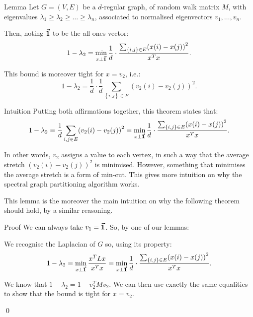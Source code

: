 \documentclass[a4paper]{article}
\begin{document}
\begin{parag}{Lemma}
    Let $G = \left(V, E\right)$ be a $d$-regular graph, of random walk matrix $M$, with eigenvalues $\lambda_1 \geq \lambda_2 \geq \ldots \geq \lambda_n$, associated to normalised eigenvectors $v_1, \ldots, v_n$.

    Then, noting $\bm{\protect\vec{1}}$ to be the all ones vector: 
    \[1 - \lambda_2 = \min_{x \perp \bvec{1}} \dfrac{1}{d}\cdot \dfrac{\sum_{\left\{i, j\right\} \in E} \left(x\left(i\right) - x\left(j\right)\right)^2}{x^T x}.\]

    This bound is moreover tight for $x = v_2$, i.e.:
    \[1 - \lambda_2 = \frac{1}{d}\cdot \frac{1}{d} \sum_{\left\{i, j\right\} \in E} \left(v_2\left(i\right) - v_2\left(j\right)\right)^2.\]

    \begin{subparag}{Intuition}
        Putting both affirmations together, this theorem states that:
        \[1 - \lambda_2 = \frac{1}{d} \sum_{i, j \in E} \left(v_2\left(i\right) - v_2\left(j\right)\right)^2 = \min_{x \perp \bvec{1}} \dfrac{1}{d}\cdot \dfrac{\sum_{\left\{i, j\right\} \in E} \left(x\left(i\right) - x\left(j\right)\right)^2}{x^T x}.\]

        In other words, $v_2$ assigns a value to each vertex, in such a way that the average stretch $\left(v_2\left(i\right) - v_2\left(j\right)\right)^2$ is minimised. However, something that minimises the average stretch is a form of min-cut.  This gives more intuition on why the spectral graph partitioning algorithm works.

        This lemma is the moreover the main intuition on why the following theorem should hold, by a similar reasoning.
    \end{subparag}
    
    \begin{subparag}{Proof}
        We can always take $v_1 = \bm{\protect\vec{1}}$. So, by one of our lemmas: 

        We recognise the Laplacian of $G$ so, using its property:
        \[1 - \lambda_2 = \min_{x \perp \bvec{1}} \frac{x^T L x}{x^T x} = \min_{x \perp \bvec{1}} \frac{1}{d}\cdot \frac{\sum_{\left\{i, j\right\} \in E} \left(x\left(i\right) - x\left(j\right)\right)^2}{x^T x}.\]

        We know that $1 - \lambda_2 = 1 - v_2^T M v_2$. We can then use exactly the same equalities to show that the bound is tight for $x = v_2$.

        \qed
    \end{subparag}
\end{parag}
 
\end{document}
